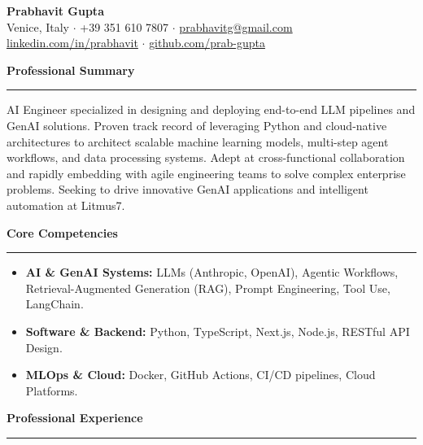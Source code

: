 \documentclass[10pt,a4paper]{article}
\begin{document}
\noindent\textbf{\LARGE Prabhavit Gupta} \\
Venice, Italy $\cdot$ +39 351 610 7807 $\cdot$ \href{mailto:prabhavitg@gmail.com}{prabhavitg@gmail.com} \\
\href{https://www.linkedin.com/in/prabhavit/}{linkedin.com/in/prabhavit} $\cdot$ \href{https://github.com/prab-gupta}{github.com/prab-gupta}

\vspace{1em}
\noindent\textbf{\large Professional Summary}
\vspace{0.5em}
\hrule
\vspace{0.5em}
AI Engineer specialized in designing and deploying end-to-end LLM pipelines and GenAI solutions. Proven track record of leveraging Python and cloud-native architectures to architect scalable machine learning models, multi-step agent workflows, and data processing systems. Adept at cross-functional collaboration and rapidly embedding with agile engineering teams to solve complex enterprise problems. Seeking to drive innovative GenAI applications and intelligent automation at Litmus7.

\vspace{1em}
\noindent\textbf{\large Core Competencies}
\vspace{0.5em}
\hrule
\vspace{0.5em}
\begin{itemize}[leftmargin=*, noitemsep]
\item \textbf{AI \& GenAI Systems:} LLMs (Anthropic, OpenAI), Agentic Workflows, Retrieval-Augmented Generation (RAG), Prompt Engineering, Tool Use, LangChain.
\item \textbf{Software \& Backend:} Python, TypeScript, Next.js, Node.js, RESTful API Design.
\item \textbf{MLOps \& Cloud:} Docker, GitHub Actions, CI/CD pipelines, Cloud Platforms.
\end{itemize}

\vspace{1em}
\noindent\textbf{\large Professional Experience}
\vspace{0.5em}
\hrule
\vspace{0.5em}
\end{document}
